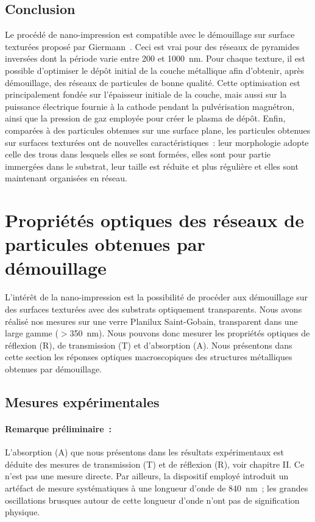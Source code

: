 \subsection{Conclusion}
Le procédé de nano-impression est compatible avec le démouillage sur surface texturées proposé par Giermann~\cite{giermann2005solid}. Ceci est vrai pour des réseaux de pyramides inversées dont la période varie entre 200 et 1000~nm. Pour chaque texture, il est possible d'optimiser le dépôt initial de la couche métallique afin d'obtenir, après démouillage, des réseaux de particules de bonne qualité. Cette optimisation est principalement fondée sur l'épaisseur initiale de la couche, mais aussi sur la puissance électrique fournie à la cathode pendant la pulvérisation magnétron, ainsi que la pression de gaz employée pour créer le plasma de dépôt. Enfin, comparées à des particules obtenues sur une surface plane, les particules obtenues sur surfaces texturées ont de nouvelles caractéristiques~: leur morphologie adopte celle des trous dans lesquels elles se sont formées, elles sont pour partie immergées dans le substrat, leur taille est réduite et plus régulière et elles sont maintenant organisées en réseau.\par 

\section[Propriétés optiques des réseaux de particules ]{Propriétés optiques des réseaux de particules obtenues par démouillage}
L'intérêt de la nano-impression est la possibilité de procéder aux démouillage sur des surfaces texturées avec des substrats optiquement transparents. Nous avons réalisé nos mesures sur une verre Planilux Saint-Gobain, transparent dans une large gamme ($>$350~nm). Nous pouvons donc mesurer les propriétés optiques de réflexion (R), de transmission (T) et d’absorption (A). Nous présentons dans cette section les réponses optiques macroscopiques des structures métalliques obtenues par démouillage.\par 

\subsection{Mesures expérimentales}
\paragraph*{Remarque préliminaire~:} L'absorption (A) que nous présentons dans les résultats expérimentaux est déduite des mesures de transmission (T) et de réflexion (R), voir chapitre II. Ce n'est pas une mesure directe. Par ailleurs, la dispositif employé introduit un artéfact de mesure systématiques à une longueur d'onde de 840~nm~; les grandes oscillations brusques autour de cette longueur d'onde n'ont pas de signification physique.\par 


